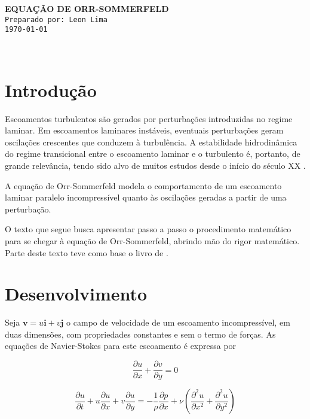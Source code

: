 \documentclass[a4paper,portuguese,10pt]{article}
\renewcommand{\D}{\partial}
\newcommand{\vecv}{\mathbf{v}}
\renewcommand{\vec}{\mathbf}
\begin{document}


\Large \color{NavyBlue} \textbf{EQUAÇÃO DE ORR-SOMMERFELD}\\
\color{Black} %
\normalsize \texttt{Preparado por: Leon Lima}\\%
\normalsize \texttt{\today}
\vspace{-2mm}

\setcounter{tocdepth}{1}
\hrulefill\\


\section{Introdução}

Escoamentos turbulentos são gerados por perturbações introduzidas no regime laminar. Em escoamentos laminares instáveis, eventuais perturbações geram oscilações crescentes que conduzem à turbulência. A estabilidade hidrodinâmica do regime transicional entre o escoamento laminar e o turbulento é, portanto, de grande relevância, tendo sido alvo de muitos estudos desde o início do século XX \cite{SCHLICHTING00}.

A equação de Orr-Sommerfeld modela o comportamento de um escoamento laminar paralelo incompressível quanto às oscilações geradas a partir de uma perturbação.

O texto que segue busca apresentar passo a passo o procedimento matemático para se chegar à equação de Orr-Sommerfeld, abrindo mão do rigor matemático. Parte deste texto teve como base o livro de \citet{SCHLICHTING00}.

\section{Desenvolvimento}

Seja $\vecv = u\vec{i}+v\vec{j}$ o campo de velocidade de um escoamento incompressível, em duas dimensões, com propriedades constantes e sem o termo de forças. As equações de Navier-Stokes para este escoamento é expressa por

\begin{equation}
  \frac{\D u}{\D x}+\frac{\D v}{\D y} = 0
  \label{eq_cont}
\end{equation}

\begin{equation}
  \frac{\D u}{\D t}+u\frac{\D u}{\D x}+v\frac{\D u}{\D y}=-\frac{1}{\rho}\frac{\D p}{\D x}+\nu\left(\frac{\D^2u}{\D x^2}+\frac{\D^2u}{\D y^2}\right)
  \label{eq_qdm_u}
\end{equation}
\end{document}
